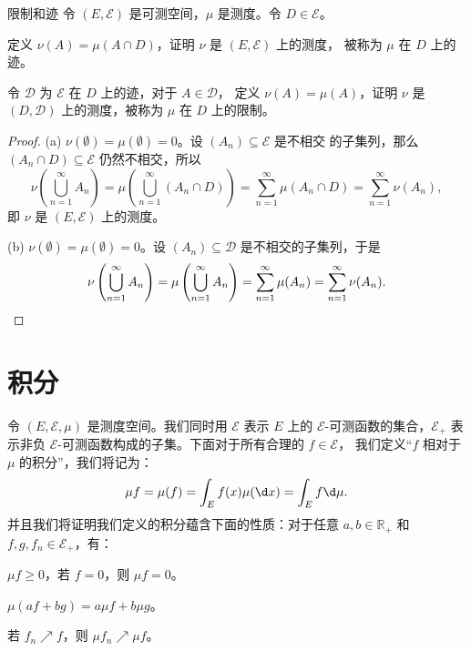 \documentclass[fontset=none]{Notes}
\begin{document}
\begin{exercise}{限制和迹}{}
  令 $(E,\mathcal{E})$ 是可测空间，$\mu$ 是测度。令 $D\in \mathcal{E}$。
  \begin{alphenum}[nosep]
    \item 定义 $\nu(A)=\mu(A\cap D)$，证明 $\nu$ 是 $(E,\mathcal{E})$ 上的测度，
    被称为 $\mu$ 在 $D$ 上的迹。
    \item 令 $\mathcal{D}$ 为 $\mathcal{E}$ 在 $D$ 上的迹，对于 $A\in \mathcal{D}$，
    定义 $\nu(A)=\mu(A)$，证明 $\nu$ 是 $(D,\mathcal{D})$ 上的测度，被称为
    $\mu$ 在 $D$ 上的限制。
  \end{alphenum}
\end{exercise}
\begin{proof}
  (a) $\nu(\emptyset)=\mu(\emptyset)=0$。设 $(A_n)\subseteq \mathcal{E}$ 是不相交
  的子集列，那么 $(A_n\cap D)\subseteq \mathcal{E}$ 仍然不相交，所以
  \[
    \nu\left(\bigcup_{n=1}^\infty A_n\right)=\mu\left(\bigcup_{n=1}^\infty (A_n\cap D)\right)
    =\sum_{n=1}^\infty \mu(A_n\cap D)=\sum_{n=1}^\infty \nu(A_n),
  \]
  即 $\nu$ 是 $(E,\mathcal{E})$ 上的测度。

  (b) $\nu(\emptyset)=\mu(\emptyset)=0$。设 $(A_n)\subseteq \mathcal{D}$
  是不相交的子集列，于是
  \[
    \nu\left(\bigcup_{n=1}^\infty A_n\right)=\mu\left(\bigcup_{n=1}^\infty A_n\right)
    =\sum_{n=1}^\infty\mu(A_n)=\sum_{n=1}^\infty\nu(A_n).\qedhere
  \]
\end{proof}

\section{积分}

令 $(E,\mathcal{E},\mu)$ 是测度空间。我们同时用 $\mathcal{E}$ 表示
$E$ 上的 $\mathcal{E}$-可测函数的集合，$\mathcal{E}_+$ 表示非负
$\mathcal{E}$-可测函数构成的子集。下面对于所有合理的 $f\in \mathcal{E}$，
我们定义“$f$ 相对于 $\mu$ 的积分”，我们将记为：
\[
  \mu f=\mu(f)=\int_E f(x) \mu(\d x)  =\int_E f \d\mu.
\]
并且我们将证明我们定义的积分蕴含下面的性质：对于任意 $a,b\in \mathbb{R}_+$
和 $f,g,f_n\in \mathcal{E}_+$，有：
\begin{description}[nosep,font=\sffamily\mdseries,itemindent=0pt]
  \item[非负性] $\mu f\geq 0$，若 $f=0$，则 $\mu f=0$。
  \item[线性性] $\mu(af+bg)=a\mu f+b\mu g$。
  \item[单调收敛定理] 若 $f_n\nearrow f$，则 $\mu f_n\nearrow \mu f$。  
\end{description}
\end{document}
